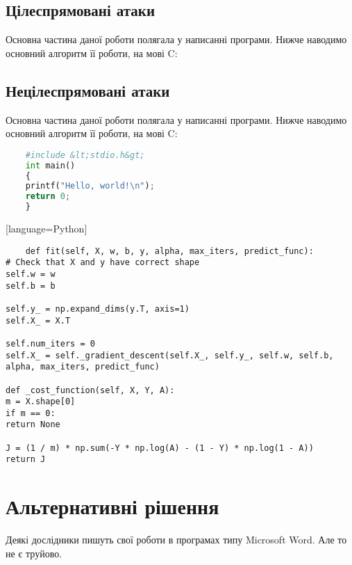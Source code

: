 \documentclass[a4paper,14pt]{extreport}
\begin{document}
	\section{Цілеспрямовані атаки} 
	Основна частина даної роботи полягала у написанні програми. Нижче наводимо основний алгоритм її роботи, на мові C:
	
	\section{Нецілеспрямовані атаки} 
	Основна частина даної роботи полягала у написанні програми. Нижче наводимо основний алгоритм її роботи, на мові C:
	
	\begin{lstlisting}[language=Python]
	% ============================================ %
	#include &lt;stdio.h&gt;
	int main() 
	{ 
	printf("Hello, world!\n"); 
	return 0; 
	} 
	\end{lstlisting}[language=Python]

	\lstset{language=Python}
	\begin{lstlisting}
    def fit(self, X, w, b, y, alpha, max_iters, predict_func):
# Check that X and y have correct shape
self.w = w
self.b = b

self.y_ = np.expand_dims(y.T, axis=1)
self.X_ = X.T

self.num_iters = 0
self.X_ = self._gradient_descent(self.X_, self.y_, self.w, self.b, alpha, max_iters, predict_func)

def _cost_function(self, X, Y, A):
m = X.shape[0]
if m == 0:
return None

J = (1 / m) * np.sum(-Y * np.log(A) - (1 - Y) * np.log(1 - A))
return J
	\end{lstlisting}
	
	
	
	\chapter{Альтернативні рішення} 
	Деякі дослідники пишуть свої роботи в програмах типу Microsoft Word. Але то не є труйово\cite{howto}.
	
	
\end{document}
